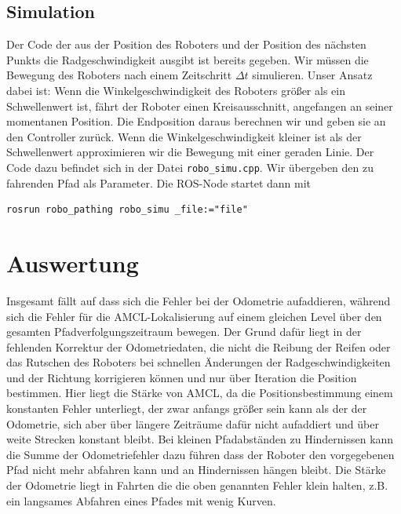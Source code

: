 \documentclass[11pt,a4paper]{article}
\begin{document}
\subsection*{Simulation}
Der Code der aus der Position des Roboters und der Position des nächsten Punkts die Radgeschwindigkeit ausgibt
ist bereits gegeben. Wir müssen die Bewegung des Roboters nach einem Zeitschritt $\Delta t$ simulieren.
Unser Ansatz dabei ist: Wenn die Winkelgeschwindigkeit des Roboters größer als ein Schwellenwert ist, fährt der Roboter einen 
Kreisausschnitt, angefangen an seiner momentanen Position. Die Endposition daraus berechnen wir und
geben sie an den Controller zurück. Wenn die Winkelgeschwindigkeit kleiner ist als der Schwellenwert
approximieren wir die Bewegung mit einer geraden Linie. Der Code dazu befindet sich in der Datei \verb|robo_simu.cpp|.
Wir übergeben den zu fahrenden Pfad als Parameter. Die ROS-Node startet dann mit \begin{verbatim}
rosrun robo_pathing robo_simu _file:="file"
\end{verbatim}
\newpage

\section{Auswertung}
Insgesamt fällt auf dass sich die Fehler bei der Odometrie aufaddieren, während sich die Fehler für die AMCL-Lokalisierung
auf einem gleichen Level über den gesamten Pfadverfolgungszeitraum bewegen. Der Grund dafür liegt in der fehlenden Korrektur der Odometriedaten, die 
nicht die Reibung der Reifen oder das Rutschen des Roboters bei schnellen Änderungen der Radgeschwindigkeiten und der Richtung korrigieren können und nur über Iteration die Position bestimmen.
Hier liegt die Stärke von AMCL, da die Positionsbestimmung einem konstanten Fehler unterliegt, der zwar anfangs größer sein kann als der der Odometrie,
sich aber über längere Zeiträume dafür nicht aufaddiert und über weite Strecken konstant bleibt. Bei kleinen Pfadabständen zu Hindernissen kann die Summe der Odometriefehler dazu führen dass 
der Roboter den vorgegebenen Pfad nicht mehr abfahren kann und an Hindernissen hängen bleibt. Die Stärke der Odometrie liegt in Fahrten 
die die oben genannten Fehler klein halten, z.B. ein langsames Abfahren eines Pfades mit wenig Kurven.


\end{document}
